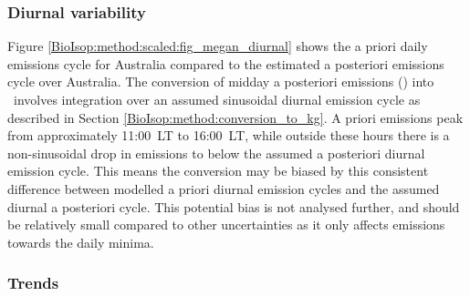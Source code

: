     \subsubsection{Diurnal variability}
    
      Figure \ref{BioIsop:method:scaled:fig_megan_diurnal} shows the a priori daily emissions cycle for Australia compared to the estimated a posteriori emissions cycle over Australia.
      The conversion of midday a posteriori emissions (\moleccms) into \tgpyr ~involves integration over an assumed sinusoidal diurnal emission cycle as described in Section \ref{BioIsop:method:conversion_to_kg}.
      A priori emissions peak from approximately 11:00~LT to 16:00~LT, while outside these hours there is a non-sinusoidal drop in emissions to below the assumed a posteriori diurnal emission cycle.
      This means the conversion may be biased by this consistent difference between modelled a priori diurnal emission cycles and the assumed diurnal a posteriori cycle.
      This potential bias is not analysed further, and should be relatively small compared to other uncertainties as it only affects emissions towards the daily minima.
      
    

    \subsubsection{Trends}
    
